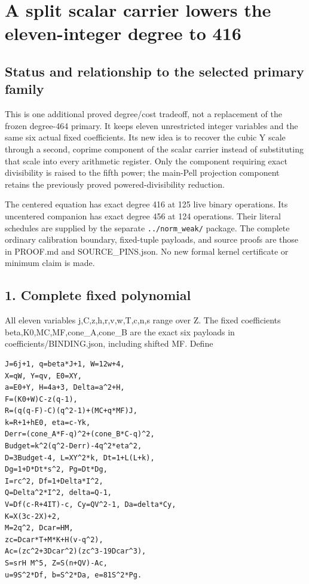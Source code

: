 \section{A split scalar carrier lowers the eleven-integer degree to 416}



\subsection*{Status and relationship to the selected primary family}



This is one additional proved degree/\allowbreak{}cost tradeoff, not a replacement of the frozen degree-464 primary. It keeps eleven unrestricted integer variables and the same six actual fixed coefficients. Its new idea is to recover the cubic Y scale through a second, coprime component of the scalar carrier instead of substituting that scale into every arithmetic register. Only the component requiring exact divisibility is raised to the fifth power; the main-Pell projection component retains the previously proved powered-divisibility reduction.



The centered equation has exact degree 416 at 125 live binary operations. Its uncentered companion has exact degree 456 at 124 operations. Their literal schedules are supplied by the separate \texttt{../\allowbreak{}norm\_\allowbreak{}weak/\allowbreak{}} package. The complete ordinary calibration boundary, fixed-tuple payloads, and source proofs are those in PROOF.md and SOURCE\_\allowbreak{}PINS.json. No new formal kernel certificate or minimum claim is made.



\subsection*{1. Complete fixed polynomial}



All eleven variables j,C,z,h,r,v,w,T,c,n,s range over Z. The fixed coefficients beta,K0,MC,MF,cone\_\allowbreak{}A,cone\_\allowbreak{}B are the exact six payloads in coefficients/\allowbreak{}BINDING.json, including shifted MF. Define



\begin{verbatim}
J=6j+1, q=beta*J+1, W=12w+4,
X=qW, Y=qv, E0=XY,
a=E0+Y, H=4a+3, Delta=a^2+H,
F=(K0+W)C-z(q-1),
R=(q(q-F)-C)(q^2-1)+(MC+q*MF)J,
k=R+1+hE0, eta=c-Yk,
Derr=(cone_A*F-q)^2+(cone_B*C-q)^2,
Budget=k^2(q^2-Derr)-4q^2*eta^2,
D=3Budget-4, L=XY^2*k, Dt=1+L(L+k),
Dg=1+D*Dt*s^2, Pg=Dt*Dg,
I=rc^2, Df=1+Delta*I^2,
Q=Delta^2*I^2, delta=Q-1,
V=Df(c-R+4IT)-c, Cy=QV^2-1, Da=delta*Cy,
K=X(3c-2X)+2,
M=2q^2, Dcar=HM,
zc=Dcar*T+M*K+H(v-q^2),
Ac=(zc^2+3Dcar^2)(zc^3-19Dcar^3),
S=srH M^5, Z=S(n+QV)-Ac,
u=9S^2*Df, b=S^2*Da, e=81S^2*Pg.
\end{verbatim}

